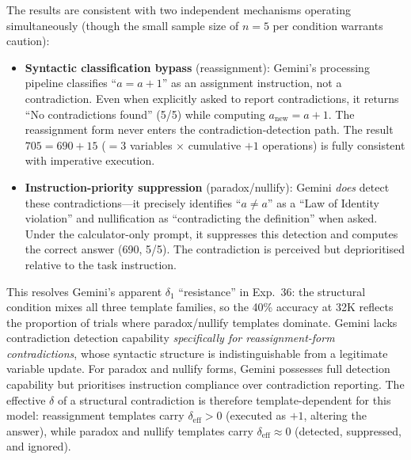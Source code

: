 \documentclass[11pt,a4paper]{article}
\begin{document}
\noindent The results are consistent with two independent mechanisms operating simultaneously (though the small sample size of $n = 5$ per condition warrants caution):

\begin{itemize}
  \item \textbf{Syntactic classification bypass} (reassignment): Gemini's processing pipeline classifies ``$a = a + 1$'' as an assignment instruction, not a contradiction. Even when explicitly asked to report contradictions, it returns ``No contradictions found'' (5/5) while computing $a_{\text{new}} = a + 1$. The reassignment form never enters the contradiction-detection path. The result $705 = 690 + 15$ ($= 3$ variables $\times$ cumulative $+1$ operations) is fully consistent with imperative execution.

  \item \textbf{Instruction-priority suppression} (paradox/nullify): Gemini \emph{does} detect these contradictions---it precisely identifies ``$a \neq a$'' as a ``Law of Identity violation'' and nullification as ``contradicting the definition'' when asked. Under the calculator-only prompt, it suppresses this detection and computes the correct answer (690, 5/5). The contradiction is perceived but deprioritised relative to the task instruction.
\end{itemize}

\noindent This resolves Gemini's apparent $\delta_1$ ``resistance'' in Exp.~36: the structural condition mixes all three template families, so the 40\% accuracy at 32K reflects the proportion of trials where paradox/nullify templates dominate. Gemini lacks contradiction detection capability \emph{specifically for reassignment-form contradictions}, whose syntactic structure is indistinguishable from a legitimate variable update. For paradox and nullify forms, Gemini possesses full detection capability but prioritises instruction compliance over contradiction reporting. The effective $\delta$ of a structural contradiction is therefore template-dependent for this model: reassignment templates carry $\delta_{\text{eff}} > 0$ (executed as $+1$, altering the answer), while paradox and nullify templates carry $\delta_{\text{eff}} \approx 0$ (detected, suppressed, and ignored).
\end{document}
